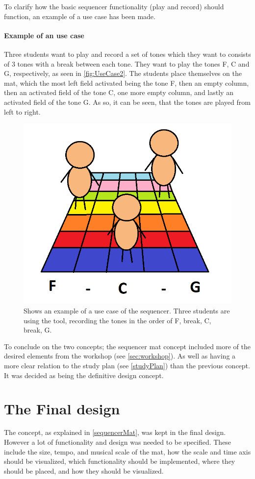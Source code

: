 To clarify how the basic sequencer functionality (play and record) should function, an example of a use case has been made.
\paragraph{Example of an use case}
Three students want to play and record a set of tones which they want to consists of 3 tones with a break between each tone. They want to play the tones F, C and G, respectively, as seen in \autoref{fig:UseCase2}. The students place themselves on the mat, which the most left field activated being the tone F, then an empty column, then an activated field of the tone C, one more empty column, and lastly an activated field of the tone G. As so, it can be seen, that the tones are played from left to right.   
\begin{figure}[H]
	\centering
	\includegraphics[width=0.7\linewidth]{figure/Design/UseCase} 
	\caption{Shows an example of a use case of the sequencer. Three students are using the tool, recording the tones in the order of F, break, C, break, G. }
	\label{fig:UseCase2}
\end{figure}

To conclude on the two concepts; the sequencer mat concept included more of the desired elements from the workshop (see \autoref{sec:workshop}). As well as having a more clear relation to the study plan (see \autoref{studyPlan}) than the previous concept.
It was decided as being the definitive design concept.

\section{The Final design}\label{designConcept}
The concept, as explained in \autoref{sequencerMat}, was kept in the final design. However a lot of functionality and design was needed to be specified. These include the size, tempo, and musical scale of the mat, how the scale and time axis should be visualized, which functionality should be implemented, where they should be placed, and how they should be visualized.

